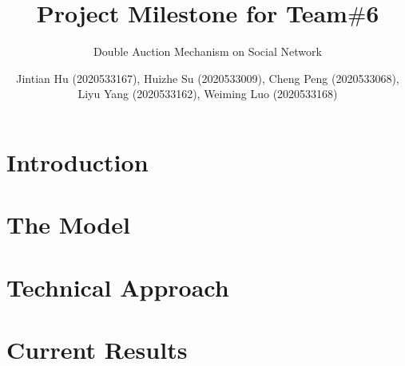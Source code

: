 \documentclass[format=acmsmall, review=false, natbib=false]{acmart}
\title{Project Milestone for Team$\#$6}
\subtitle{Double Auction Mechanism on Social Network}
\author{Jintian Hu (2020533167), Huizhe Su (2020533009), Cheng Peng (2020533068), Liyu Yang (2020533162), Weiming Luo (2020533168)}
\begin{document}
\maketitle

\section{Introduction}


\section{The Model}


\section{Technical Approach}


\section{Current Results}



\nocite{*}

\printbibliography
\end{document}
